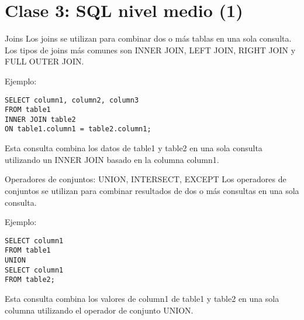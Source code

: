 \hypertarget{clase-3-sql-nivel-medio-1}{%
\section{Clase 3: SQL nivel medio (1)}\label{clase-3-sql-nivel-medio-1}}

\begin{frame}[fragile]{Joins}
\protect\hypertarget{joins}{}
Los joins se utilizan para combinar dos o más tablas en una sola
consulta. Los tipos de joins más comunes son INNER JOIN, LEFT JOIN,
RIGHT JOIN y FULL OUTER JOIN.

Ejemplo:

\begin{verbatim}
SELECT column1, column2, column3 
FROM table1 
INNER JOIN table2 
ON table1.column1 = table2.column1;
\end{verbatim}

Esta consulta combina los datos de table1 y table2 en una sola consulta
utilizando un INNER JOIN basado en la columna column1.
\end{frame}

\begin{frame}[fragile]{Operadores de conjuntos: UNION, INTERSECT,
EXCEPT}
\protect\hypertarget{operadores-de-conjuntos-union-intersect-except}{}
Los operadores de conjuntos se utilizan para combinar resultados de dos
o más consultas en una sola consulta.

Ejemplo:

\begin{verbatim}
SELECT column1 
FROM table1 
UNION 
SELECT column1 
FROM table2;
\end{verbatim}

Esta consulta combina los valores de column1 de table1 y table2 en una
sola columna utilizando el operador de conjunto UNION.
\end{frame}
